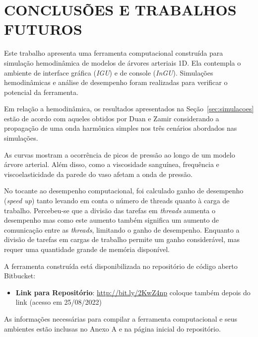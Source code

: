 \chapter{CONCLUSÕES E TRABALHOS FUTUROS}\label{sec:conclusoes}
\justifying


Este trabalho apresenta uma ferramenta computacional construída para simulação hemodinâmica de modelos de árvores arteriais 1D. Ela contempla o ambiente de interface gráfica (\textit{IGU}) e de console (\textit{InGU}). Simulações hemodinâmicas e análise de desempenho foram realizadas para verificar o potencial da ferramenta.

Em relação a hemodinâmica, os resultados apresentados na Seção~\ref{sec:simulacoes} estão de acordo com aqueles obtidos por Duan e Zamir\textcolor{blue}{ \cite{Duan1992} } considerando a propagação de uma onda harmônica simples nos três cenários abordados nas simulações. 

As curvas mostram a ocorrência de picos de pressão ao longo de um modelo árvore arterial. Além disso, como a viscosidade sanguínea, frequência e viscoelasticidade da parede do vaso afetam a onda de pressão.

No tocante ao desempenho computacional, foi calculado ganho de desempenho (\textit{speed up}) tanto levando em conta o número de threads quanto à carga de trabalho. Percebeu-se que a divisão das tarefas em \textit{threads} aumenta o desempenho mas como este aumento também significa um aumento de comunicação entre as \textit{threads}, limitando o ganho de desempenho. Enquanto a divisão de tarefas em cargas de trabalho permite um ganho considerável, mas requer uma quantidade grande de memória disponível.

A ferramenta construída está disponibilizada no repositório de código aberto Bitbucket:

\begin{itemize}
	\item \textbf{Link para Repositório}: \href{http://bit.ly/2KwZ4np}{http://bit.ly/2KwZ4np} coloque também depois do link (acesso em 25/08/2022)
\end{itemize}

As informações necessárias para compilar a ferramenta computacional e seus ambientes estão inclusas no Anexo A e na página inicial do repositório.

